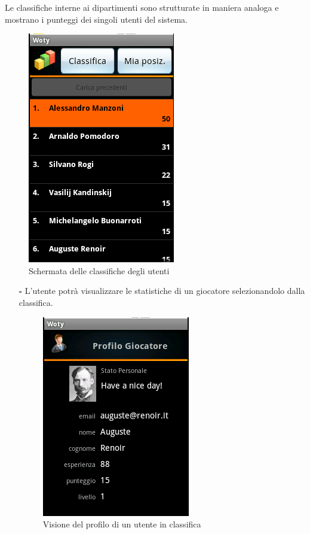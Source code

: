 Le classifiche interne ai dipartimenti sono strutturate in maniera analoga e mostrano i punteggi dei singoli utenti del sistema.

\begin{center}
\begin{figure}[H]
\centering
\includegraphics[scale=0.55]{images/usersranks.png}
\caption{ Schermata delle classifiche degli utenti}
\end{figure}
\end{center}

\begin{itemize}
	\item[\textbf{-}] L'utente potrà visualizzare le statistiche di un giocatore selezionandolo dalla classifica.
		
		\begin{center}
		\begin{figure}[H]
		\centering
		\includegraphics[scale=0.55]{images/playerprofile.png}
		\caption{ Visione del profilo di un utente in classifica }
		\end{figure}
		\end{center}

\end{itemize}



